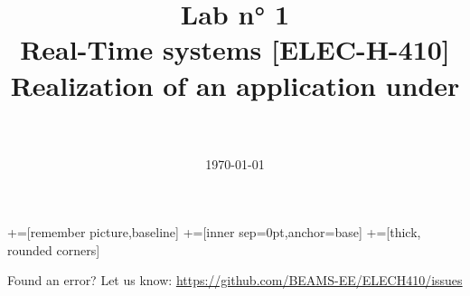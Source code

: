 \documentclass[10pt,a4paper]{article}
\date{\vspace{-1cm}\mydate\today}
\title{\vspace{-2cm} Lab n° 1\\ Real-Time systems [ELEC-H-410]\\ Realization of an application under \rtos~\ifthenelse{\boolean{corrige}}{~\\Corrigé}{}}
\theoremstyle{definition}%
\begin{document}
    \newcommand\tabnode[1]{\addtocounter{nodecount}{1} \tikz \node (\arabic{nodecount}) {#1};}
    
    +=[remember picture,baseline]
    +=[inner sep=0pt,anchor=base]
    +=[thick, rounded corners]
    
    
    \maketitle
    
    
    
    
    \vfill
    \footnotesize{
        Found an error? Let us know: \url{https://github.com/BEAMS-EE/ELECH410/issues}
    }
    
    \newpage
    
\end{document}
